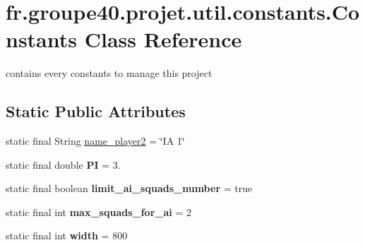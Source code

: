 \hypertarget{classfr_1_1groupe40_1_1projet_1_1util_1_1constants_1_1_constants}{}\section{fr.\+groupe40.\+projet.\+util.\+constants.\+Constants Class Reference}
\label{classfr_1_1groupe40_1_1projet_1_1util_1_1constants_1_1_constants}


contains every constants to manage this project  


\subsection*{Static Public Attributes}
\begin{DoxyCompactItemize}
\item 
static final String \hyperlink{classfr_1_1groupe40_1_1projet_1_1util_1_1constants_1_1_constants_a71c5ccb106079fbc6e180ad452b38522}{name\+\_\+player2} = \char`\"{}IA 1\char`\"{}
\item 
\mbox{\label{classfr_1_1groupe40_1_1projet_1_1util_1_1constants_1_1_constants_ad0ff0111b5b94b015519aa694d2bcc16}} 
static final double {\bfseries PI} = 3.
\item 
\mbox{\label{classfr_1_1groupe40_1_1projet_1_1util_1_1constants_1_1_constants_ae0125e046a3fa35a0a57e99eae614bc2}} 
static final boolean {\bfseries limit\+\_\+ai\+\_\+squads\+\_\+number} = true
\item 
\mbox{\label{classfr_1_1groupe40_1_1projet_1_1util_1_1constants_1_1_constants_ae218383033f773d7bda3142ae41f1083}} 
static final int {\bfseries max\+\_\+squads\+\_\+for\+\_\+ai} = 2
\item 
\mbox{\label{classfr_1_1groupe40_1_1projet_1_1util_1_1constants_1_1_constants_a3f76d90b5902d529b1e5841b2e70de3c}} 
static final int {\bfseries width} = 800
\item 
\mbox{\label{classfr_1_1groupe40_1_1projet_1_1util_1_1constants_1_1_constants_a998ba4f61987c6cbc0ab7816dfe6f41d}} 

\end{DoxyCompactItemize}
